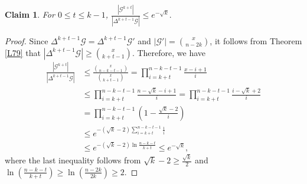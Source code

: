 \documentclass[11pt]{article}
\numberwithin{equation}{section}
\newtheorem{claim}{Claim}[section]
\begin{document}
		\begin{claim}\label{cl4}
	For $0 \le t \le k-1$,	$\frac{|\mathcal{G}^{k+t}|}{|\Delta^{k+t-1}{\mathcal{G}}|}\le e^{-\sqrt{k}}.$ 
		
	\end{claim}
	\begin{proof}
Since  $\Delta^{k+t-1}{\mathcal{G}}=\Delta^{k+t-1}{\mathcal{G}'}$ and $|\mathcal{G}'|=\binom{x}{n-2k} $, 
  it follows from  Theorem \ref{L79} that
  $|\Delta^{k+t-1}{\mathcal{G}}|\geq\binom{x}{k+t-1}$.
Therefore, we have
\begin{align*} 
\frac{|\mathcal{G}^{k+t}|}{|\Delta^{k+t-1}{\mathcal{G}}|}&\le \frac{\binom{x}{n-k-t-1}}{\binom{x}{k+t-1}}
= \prod\limits_{i=k+t}^{n-k-t-1} \frac{x-i+1}{i}\\
&\le \prod\limits_{i=k+t}^{n-k-t-1} \frac{n-\sqrt{k}-i+1}{i}
=\prod\limits_{i=k+t}^{n-k-t-1} \frac{i-\sqrt{k}+2}{i}
\\
&
=\prod\limits_{i=k+t}^{n-k-t-1} \left(1-\frac{\sqrt{k}-2}{i}\right)\\
  &\le e^{-(\sqrt{k}-2)\sum\limits_{i=k+t}^{n-k-t-1}\frac{1}{i}}\\
  &\le e^{-(\sqrt{k}-2)\ln \frac{n-k-t}{k+t}} 
  \le e^{-\sqrt{k}},
\end{align*}
  where the last inequality follows from 
	 $\sqrt{k}-2\ge \frac{\sqrt{k}}{2}$ and $\ln \left(\frac{n-k-t}{k+t}\right)\ge \ln \left(\frac{n-2k}{2k}\right)\ge 2$.
	\end{proof}
\end{document}
